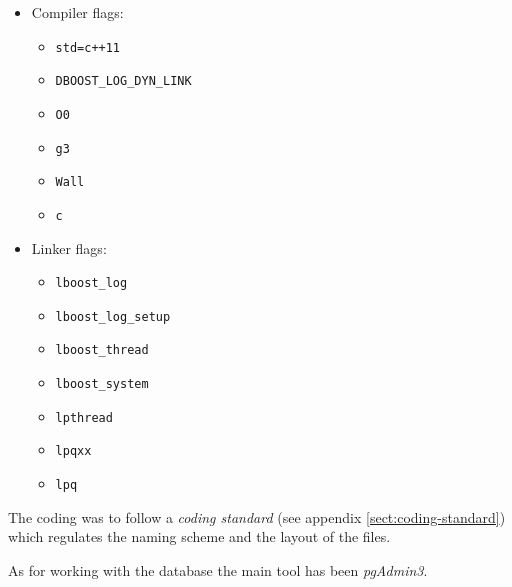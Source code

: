 \documentclass[../main.tex]{subfiles}
\begin{document}
\begin{itemize}
    \item Compiler flags:
    \begin{itemize}
        \item \texttt{std=c++11}
        \item \texttt{DBOOST\_LOG\_DYN\_LINK}
        \item \texttt{O0}
        \item \texttt{g3}
        \item \texttt{Wall}
        \item \texttt{c}
    \end{itemize}  
    \item Linker flags: 
    \begin{itemize}
        \item \texttt{lboost\_log}
        \item \texttt{lboost\_log\_setup}
        \item \texttt{lboost\_thread}
        \item \texttt{lboost\_system}
        \item \texttt{lpthread}
        \item \texttt{lpqxx}
        \item \texttt{lpq}
    \end{itemize}
\end{itemize}

\vspace{1em}
\noindent
The coding was to follow a \textit{coding standard} (see appendix \ref{sect:coding-standard}) which regulates the naming scheme and the layout of the files.

As for working with the database the main tool has been \textit{pgAdmin3}.
\end{document}
